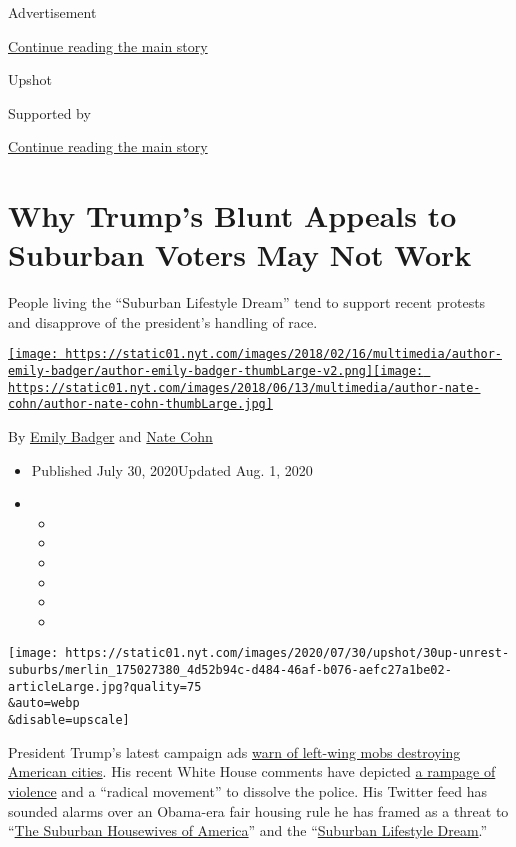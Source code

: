 Advertisement

\protect\hyperlink{after-top}{Continue reading the main story}

Upshot

Supported by

\protect\hyperlink{after-sponsor}{Continue reading the main story}

\hypertarget{why-trumps-blunt-appeals-to-suburban-voters-may-not-work}{%
\section{Why Trump's Blunt Appeals to Suburban Voters May Not
Work}\label{why-trumps-blunt-appeals-to-suburban-voters-may-not-work}}

People living the ``Suburban Lifestyle Dream'' tend to support recent
protests and disapprove of the president's handling of race.

\href{https://www.nytimes.com/by/emily-badger}{\texttt{[image: https://static01.nyt.com/images/2018/02/16/multimedia/author-emily-badger/author-emily-badger-thumbLarge-v2.png]}}\href{https://www.nytimes.com/by/nate-cohn}{\texttt{[image: https://static01.nyt.com/images/2018/06/13/multimedia/author-nate-cohn/author-nate-cohn-thumbLarge.jpg]}}

By \href{https://www.nytimes.com/by/emily-badger}{Emily Badger} and
\href{https://www.nytimes.com/by/nate-cohn}{Nate Cohn}

\begin{itemize}
\item
  Published July 30, 2020Updated Aug. 1, 2020
\item
  \begin{itemize}
  \item
  \item
  \item
  \item
  \item
  \item
  \end{itemize}
\end{itemize}

\texttt{[image: https://static01.nyt.com/images/2020/07/30/upshot/30up-unrest-suburbs/merlin\_175027380\_4d52b94c-d484-46af-b076-aefc27a1be02-articleLarge.jpg?quality=75\\\&auto=webp\\\&disable=upscale]}

President Trump's latest campaign ads
\href{https://www.nytimes.com/2020/07/21/us/politics/trump-campaign-ads.html}{warn
of left-wing mobs destroying American cities}. His recent White House
comments have depicted
\href{https://www.whitehouse.gov/briefings-statements/remarks-president-trump-operation-legend-combatting-violent-crime-american-cities/}{a
rampage of violence} and a ``radical movement'' to dissolve the police.
His Twitter feed has sounded alarms over an Obama-era fair housing rule
he has framed as a threat to
``\href{https://twitter.com/realDonaldTrump/status/1286372175117791236}{The
Suburban Housewives of America}'' and the
``\href{https://twitter.com/realDonaldTrump/status/1288509568578777088?s=20}{Suburban
Lifestyle Dream}.''

